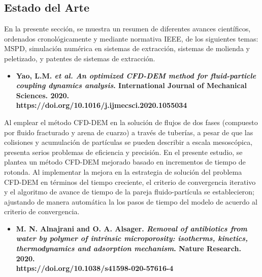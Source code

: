 \begin{center}
	\section{Estado del Arte}
\end{center}

\noindent
\justify

En la presente secci\'on, se muestra un resumen de diferentes avances cient\'ificos, ordenados cronol\'ogicamente y mediante normativa IEEE, de los siguientes temas: MSPD, simulaci\'on num\'erica en sistemas de extracci\'on, sistemas de molienda y peletizado, y patentes de sistemas de extracci\'on.

\begin{itemize}
	\item{\textbf{Yao, L.M. \textit{et al. An optimized CFD-DEM method for fluid-particle coupling dynamics analysis}. International Journal of Mechanical Sciences. 2020. \\https://doi.org/10.1016/j.ijmecsci.2020.1055034}}
\end{itemize}

\noindent
\justify

Al emplear el m\'etodo CFD-DEM en la soluci\'on de flujos de dos fases (compuesto por fluido fracturado y arena de cuarzo) a trav\'es de tuber\'ias, a pesar de que las colisiones y acumulaci\'on de part\'iculas se pueden describir a escala mesosc\'opica, presenta serios problemas de eficiencia y precisi\'on. En el presente estudio, se plantea un m\'etodo CFD-DEM mejorado basado en incrementos de tiempo de rotonda. Al implementar la mejora en la estrategia de soluci\'on del problema CFD-DEM en t\'erminos del tiempo creciente, el criterio de convergencia iterativo y el algoritmo de avance de tiempo de la pareja fluido-part\'icula se establecieron; ajustando de manera autom\'atica la los pasos de tiempo del modelo de acuerdo al criterio de convergencia.

\begin{itemize}
	\item{\textbf{M. N. Alnajrani and O. A. Alsager. \textit{Removal of antibiotics from water by polymer of intrinsic microporosity: isotherms, kinetics, thermodynamics and adsorption mechanism}. Nature Research. 2020. \\https://doi.org/10.1038/s41598-020-57616-4}}
\end{itemize}

\noindent
\justify

